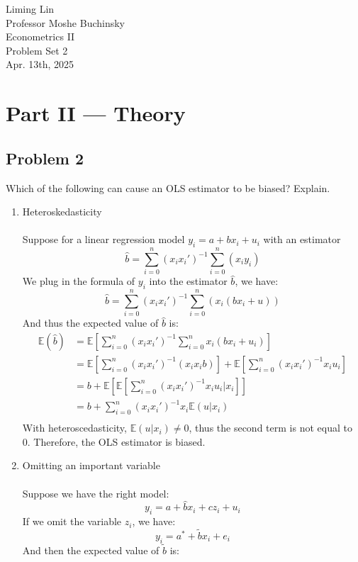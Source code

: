 \documentclass[12pt]{article}
\begin{document}
\begin{flushleft}
Liming Lin\\
Professor Moshe Buchinsky\\
Econometrics II\\
Problem Set 2\\
Apr. 13th, 2025\\
\section*{Part II --- Theory}
\subsection*{Problem 2}
Which of the following can cause an OLS estimator to be biased? Explain.\\
\begin{enumerate}
    \item Heteroskedasticity\\~\\
    Suppose for a linear regression model $y_i=a+bx_i+u_i$ with an estimator 
    \[
    \hat{b}=\sum_{i=0}^n(x_i x_i')^{-1}\sum_{i=0}^n(x_i y_i)
    \]
    We plug in the formula of $y_i$ into the estimator $\hat{b}$, we have: 
    \[
    \hat{b}=\sum_{i=0}^n(x_i x_i')^{-1}\sum_{i=0}^n(x_i (bx_i+u))
    \]
    And thus the expected value of $\hat{b}$ is:
    \begin{align*}
    \mathbb{E}(\hat{b}) &=\mathbb{E}\left[\sum_{i=0}^n(x_i x_i')^{-1}\sum_{i=0}^nx_i (bx_i+u_i)\right] \\
    &= \mathbb{E}\left[\sum_{i=0}^n(x_i x_i')^{-1}(x_i x_i b)\right]+\mathbb{E}\left[\sum_{i=0}^n(x_i x_i')^{-1}x_i u_i\right] \\
    &= b+\mathbb{E}\left[\mathbb{E}\left[\sum_{i=0}^n(x_i x_i')^{-1}x_i u_i | x_i \right]\right] \\
    &= b + \sum_{i=0}^n(x_i x_i')^{-1}x_i \mathbb{E}(u | x_i) \\
    \end{align*}
    With heteroscedasticity, $\mathbb{E}(u | x_i) \neq 0$, thus the second term is not equal to 0. Therefore, the OLS estimator is biased.
    \item Omitting an important variable \\~\\
    Suppose we have the right model:
    \[
    y_i=a+\hat{b}x_i+cz_i+u_i
    \]
    If we omit the variable $z_i$, we have:
    \[
    y_i=a^*+\tilde{b}x_i+e_i
    \]
    And then the expected value of $\tilde{b}$ is:

\end{enumerate}
\end{flushleft}
\end{document}
